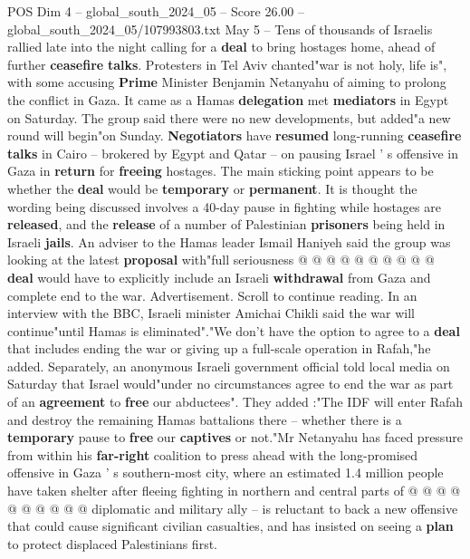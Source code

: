 \begin{textsample}{POS Dim 4 – global\_south\_2024\_05 – Score 26.00 – global\_south\_2024\_05/107993803.txt}  \label{ex:f4_pos_202}
May 5 -- Tens of thousands of Israelis rallied late into the night calling for a \textbf{deal} to bring hostages home, ahead of further \textbf{ceasefire} \textbf{talks}.
Protesters in Tel Aviv chanted"war is not holy, life is", with some accusing \textbf{Prime} Minister Benjamin Netanyahu of aiming to prolong the conflict in Gaza.
It came as a Hamas \textbf{delegation} met \textbf{mediators} in Egypt on Saturday.
The group said there were no new developments, but added"a new round will begin"on Sunday. \textbf{Negotiators} have \textbf{resumed} long-running \textbf{ceasefire} \textbf{talks} in Cairo -- brokered by Egypt and Qatar -- on pausing Israel ' s offensive in Gaza in \textbf{return} for \textbf{freeing} hostages.
The main sticking point appears to be whether the \textbf{deal} would be \textbf{temporary} or \textbf{permanent}.
It is thought the wording being discussed involves a 40-day pause in fighting while hostages are \textbf{released}, and the \textbf{release} of a number of Palestinian \textbf{prisoners} being held in Israeli \textbf{jails}.
An adviser to the Hamas leader Ismail Haniyeh said the group was looking at the latest \textbf{proposal} with"full seriousness @ @ @ @ @ @ @ @ @ @ \textbf{deal} would have to explicitly include an Israeli \textbf{withdrawal} from Gaza and complete end to the war.
Advertisement.
Scroll to continue reading.
In an interview with the BBC, Israeli minister Amichai Chikli said the war will continue"until Hamas is eliminated"."We don't have the option to agree to a \textbf{deal} that includes ending the war or giving up a full-scale operation in Rafah,"he added.
Separately, an anonymous Israeli government official told local media on Saturday that Israel would"under no circumstances agree to end the war as part of an \textbf{agreement} to \textbf{free} our abductees".
They added :"The IDF will enter Rafah and destroy the remaining Hamas battalions there -- whether there is a \textbf{temporary} pause to \textbf{free} our \textbf{captives} or not."Mr Netanyahu has faced pressure from within his \textbf{far-right} coalition to press ahead with the long-promised offensive in Gaza ' s southern-most city, where an estimated 1.4 million people have taken shelter after fleeing fighting in northern and central parts of @ @ @ @ @ @ @ @ @ @ diplomatic and military ally -- is reluctant to back a new offensive that could cause significant civilian casualties, and has insisted on seeing a \textbf{plan} to protect displaced Palestinians first.

\end{textsample}
